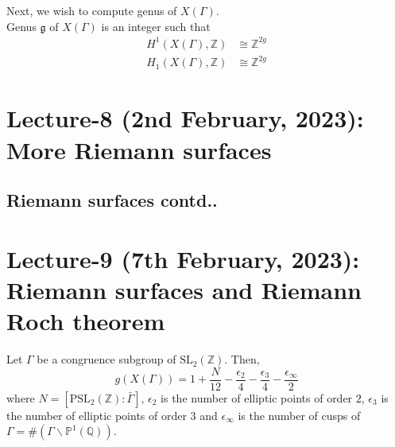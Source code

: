 \documentclass[oneside, 12pt]{scrbook}
\newcommand{\QQ}{\mathbb Q}
\newcommand{\ZZ}{\mathbb Z}
\newcommand{\PP}{\mathbb{P}}
\newcommand{\SL}{\mathrm{SL}}
\newcommand{\bs}{\backslash}
\theoremstyle{theorem}
\begin{document}
Next, we wish to compute genus of $X(\Gamma)$. \\
Genus $\mathfrak{g}$ of $X(\Gamma)$ is an integer such that 
\begin{align*}
H^1(X(\Gamma), \ZZ) &\cong \ZZ^{2g} \\
H_{1}(X(\Gamma), \ZZ) &\cong \ZZ^{2g}
\end{align*}



\chapter{Lecture-8 (2nd February, 2023): More Riemann surfaces}

\section{Riemann surfaces contd..}


\chapter{Lecture-9 (7th February, 2023): Riemann surfaces and Riemann Roch theorem}

\begin{corollary}
Let $\Gamma$ be a congruence subgroup of $\SL_{2}(\ZZ)$. Then, $$g(X(\Gamma)) = 1 + \frac{N}{12} - \frac{\epsilon_{2}}{4} - \frac{\epsilon_{3}}{4} - \frac{\epsilon_{\infty}}{2}$$ where $N = [\mathrm{PSL}_{2}(\ZZ): \bar{\Gamma}]$, $\epsilon_{2}$ is the number of elliptic points of order $2$, $\epsilon_{3}$ is the number of elliptic points of order $3$ and $\epsilon_{\infty}$ is the number of cusps of $\Gamma = \#(\Gamma \bs \PP^{1}(\QQ))$.
\end{corollary}
\end{document}
